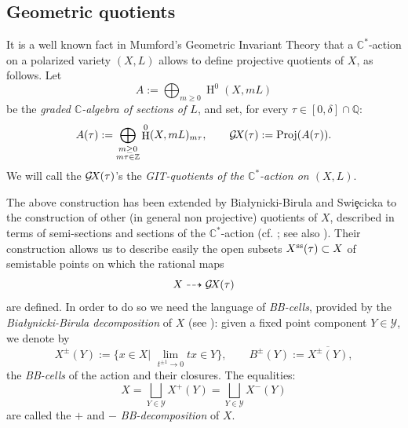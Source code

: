 \documentclass[10pt,a4paper]{article}
\numberwithin{equation}{section}
\theoremstyle{definition}
\theoremstyle{remark}
\DeclareMathOperator{\HH}{H}
\def\C{{\mathbb C}}
\def\Q{{\mathbb Q}}
\def\Z{{\mathbb Z}}
\def\cY{{\mathcal Y}}
\def\Q{{\mathbb{Q}}}
\def\operatorname#1{\mathop{\rm #1}\nolimits}
\def\Proj{\operatorname{Proj}}
\def\GX{\mathcal{G}\!X\hspace{-0.5pt}}
\def\ss{\operatorname{ss}}
\newcommand\m{{\mathfrak m}}
\begin{document}
\setcounter{section}{2}\setcounter{subsection}{2}\setcounter{theorem}{5}\setcounter{equation}{2}

\subsection{Geometric quotients}\label{wors6:sssec:quotients} It is a well known fact in Mumford's Geometric Invariant Theory that a $\C^*$-action on a polarized variety $(X,L)$  allows to define projective quotients of $X$, as follows. Let 
\[A:=\bigoplus_{m\geq 0}\HH^0(X,mL)\] 
be the {\em graded $\C$-algebra of sections of $L$}, and set, for every $\tau \in [0,\delta]\cap \Q$:
 \[A(\tau):=\bigoplus_{\substack{m\geq 0\\m\tau\in\Z}}\HH^0(X,mL)_{m\tau},\qquad \GX(\tau):=\Proj(A(\tau)).
\]
We will call the  $\GX(\tau)$'s the {\em GIT-quotients of the $\C^*$-action on $(X,L)$}.

The above construction has been extended by Bia{\l}ynicki-Birula and Swi\c{e}cicka to the construction of other (in general non projective) quotients of $X$, described in terms of semi-sections and sections of the $\C^*$-action (cf. \cite{wors6-BBS}; see also \cite{wors6-WORS3}). Their construction allows us to describe easily the open subsets $X^{\ss}(\tau)\subset X$ of semistable points on which the rational maps
$$
X\dashrightarrow \GX(\tau)
$$
are defined. 
In order to do so we need the language of {\em BB-cells}, provided by the {\em Bia{\l}ynicki-Birula decomposition} of $X$ (see \cite{wors6-BB,wors6-CARRELL}): given a fixed point component $Y\in \cY$, we denote by 
\begin{equation}\label{wors6:eq:BBcells}
X^\pm(Y):=\displaystyle\{x\in X|\,\, \lim_{t^{\pm 1}\to 0} tx\in Y\},\qquad 
B^\pm(Y):=\overline{X^\pm(Y)},
\end{equation}
the {\it BB-cells} of the action and their closures. The equalities:
\[X=\bigsqcup_{Y\in \cY}X^+(Y)=\bigsqcup_{Y\in \cY}X^-(Y)
\]
are called the {\em $+$} and {\em $-$ BB-decomposition} of $X$. 
\end{document}
